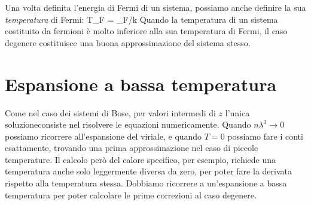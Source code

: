 Una volta definita l'energia di Fermi di un sistema, possiamo anche definire la
sua {\em temperatura} di Fermi:
\be
T_F = \eps_F/k
\ee
Quando la temperatura di un sistema costituito da fermioni è molto inferiore
alla sua temperatura di Fermi, il caso degenere costituisce una buona
approssimazione del sistema stesso.

\section{Espansione a bassa temperatura}

Come nel caso dei sistemi di Bose, per valori intermedi di $z$ l'unica
soluzioneconsiste nel risolvere le equazioni numericamente. Quando
$n\lambda^3\to 0$
possiamo ricorrere all'espansione del viriale, e quando $T=0$ possiamo fare i
conti esattamente, trovando una prima approssimazione nel caso di piccole
temperature. Il calcolo però del calore specifico, per esempio, richiede una
temperatura anche solo leggermente diversa da zero, per poter fare la derivata
rispetto alla temperatura stessa. Dobbiamo ricorrere a un'espansione a bassa
temperatura per poter calcolare le prime correzioni al caso degenere.

